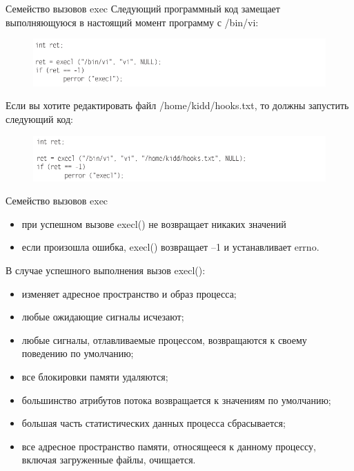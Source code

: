 \documentclass[xcolor=table]{beamer}
\begin{document}
\begin{frame}{Семейство вызовов exec}
Следующий программный код замещает выполняющуюся в настоящий момент программу с /bin/vi:
\begin{figure}[h]
\centering
\includegraphics[scale=0.5]{images/lec07-pic05.png}
\end{figure}
Если вы хотите редактировать файл /home/kidd/hooks.txt, то должны запустить следующий код:
\begin{figure}[h]
\centering
\includegraphics[scale=0.5]{images/lec07-pic06.png}
\end{figure}
\end{frame}

\begin{frame}{Семейство вызовов exec}
\begin{itemize}
\item при успешном вызове execl() не возвращает никаких значений 
\item если произошла ошибка, execl() возвращает –1 и устанавливает errno.
\end{itemize}
В случае успешного выполнения вызов execl():
\begin{itemize}
\item изменяет адресное пространство и образ процесса;
\item любые ожидающие сигналы исчезают;
\item любые сигналы, отлавливаемые процессом, возвращаются к своему
поведению по умолчанию;
\item все блокировки памяти удаляются;
\item большинство атрибутов потока возвращается к значениям по умолчанию;
\item большая часть статистических данных процесса сбрасывается;
\item все адресное пространство памяти, относящееся к данному процессу, включая
загруженные файлы, очищается.
\end{itemize}
\end{frame}
\end{document}
